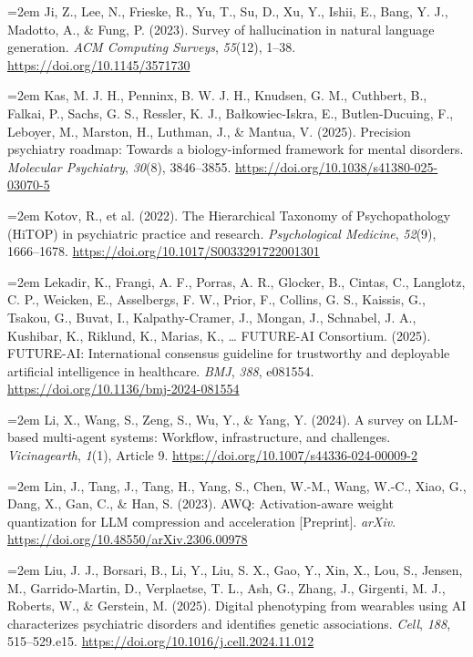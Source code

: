 \documentclass[11pt,a4paper,twoside]{article}
\begin{document}
\hangindent=2em Ji, Z., Lee, N., Frieske, R., Yu, T., Su, D., Xu, Y., Ishii, E., Bang, Y. J., Madotto, A., \& Fung, P. (2023). Survey of hallucination in natural language generation. \textit{ACM Computing Surveys}, \textit{55}(12), 1--38. \url{https://doi.org/10.1145/3571730}

\hangindent=2em Kas, M. J. H., Penninx, B. W. J. H., Knudsen, G. M., Cuthbert, B., Falkai, P., Sachs, G. S., Ressler, K. J., Ba\l{}kowiec-Iskra, E., Butlen-Ducuing, F., Leboyer, M., Marston, H., Luthman, J., \& Mantua, V. (2025). Precision psychiatry roadmap: Towards a biology-informed framework for mental disorders. \textit{Molecular Psychiatry}, \textit{30}(8), 3846--3855. \url{https://doi.org/10.1038/s41380-025-03070-5}

\hangindent=2em Kotov, R., et al. (2022). The Hierarchical Taxonomy of Psychopathology (HiTOP) in psychiatric practice and research. \textit{Psychological Medicine}, \textit{52}(9), 1666--1678. \url{https://doi.org/10.1017/S0033291722001301}

\hangindent=2em Lekadir, K., Frangi, A. F., Porras, A. R., Glocker, B., Cintas, C., Langlotz, C. P., Weicken, E., Asselbergs, F. W., Prior, F., Collins, G. S., Kaissis, G., Tsakou, G., Buvat, I., Kalpathy-Cramer, J., Mongan, J., Schnabel, J. A., Kushibar, K., Riklund, K., Marias, K., \ldots{} FUTURE-AI Consortium. (2025). FUTURE-AI: International consensus guideline for trustworthy and deployable artificial intelligence in healthcare. \textit{BMJ}, \textit{388}, e081554. \url{https://doi.org/10.1136/bmj-2024-081554}

\hangindent=2em Li, X., Wang, S., Zeng, S., Wu, Y., \& Yang, Y. (2024). A survey on LLM-based multi-agent systems: Workflow, infrastructure, and challenges. \textit{Vicinagearth}, \textit{1}(1), Article 9. \url{https://doi.org/10.1007/s44336-024-00009-2}

\hangindent=2em Lin, J., Tang, J., Tang, H., Yang, S., Chen, W.-M., Wang, W.-C., Xiao, G., Dang, X., Gan, C., \& Han, S. (2023). AWQ: Activation-aware weight quantization for LLM compression and acceleration [Preprint]. \textit{arXiv}. \url{https://doi.org/10.48550/arXiv.2306.00978}

\hangindent=2em Liu, J. J., Borsari, B., Li, Y., Liu, S. X., Gao, Y., Xin, X., Lou, S., Jensen, M., Garrido-Martin, D., Verplaetse, T. L., Ash, G., Zhang, J., Girgenti, M. J., Roberts, W., \& Gerstein, M. (2025). Digital phenotyping from wearables using AI characterizes psychiatric disorders and identifies genetic associations. \textit{Cell}, \textit{188}, 515--529.e15. \url{https://doi.org/10.1016/j.cell.2024.11.012}
\end{document}
